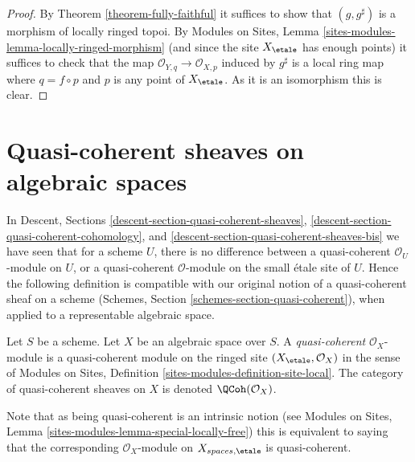 \begin{proof}
By
Theorem \ref{theorem-fully-faithful}
it suffices to show that $(g, g^\sharp)$ is a morphism of
locally ringed topoi. By
Modules on Sites, Lemma \ref{sites-modules-lemma-locally-ringed-morphism}
(and since the site $X_\etale$ has enough points)
it suffices to check that the map
$\mathcal{O}_{Y, q} \to \mathcal{O}_{X, p}$ induced by $g^\sharp$
is a local ring map where $q = f \circ p$ and $p$ is any point of
$X_\etale$. As it is an isomorphism this is clear.
\end{proof}














\section{Quasi-coherent sheaves on algebraic spaces}
\label{section-quasi-coherent}

\noindent
In
Descent, Sections \ref{descent-section-quasi-coherent-sheaves},
\ref{descent-section-quasi-coherent-cohomology}, and
\ref{descent-section-quasi-coherent-sheaves-bis}
we have seen that for a scheme $U$, there is no difference between a
quasi-coherent $\mathcal{O}_U$-module on $U$, or a quasi-coherent
$\mathcal{O}$-module on the small \'etale site of $U$. Hence the following
definition is compatible with our original notion of a quasi-coherent sheaf
on a scheme
(Schemes, Section \ref{schemes-section-quasi-coherent}),
when applied to a representable algebraic space.

\begin{definition}
\label{definition-quasi-coherent}
Let $S$ be a scheme. Let $X$ be an algebraic space over $S$.
A {\it quasi-coherent} $\mathcal{O}_X$-module
is a quasi-coherent module on the ringed site
$(X_\etale, \mathcal{O}_X)$ in the sense of
Modules on Sites,
Definition \ref{sites-modules-definition-site-local}.
The category of quasi-coherent sheaves on $X$ is denoted
$\QCoh(\mathcal{O}_X)$.
\end{definition}

\noindent
Note that as being quasi-coherent is an intrinsic notion (see
Modules on Sites, Lemma \ref{sites-modules-lemma-special-locally-free})
this is equivalent to saying that the corresponding $\mathcal{O}_X$-module
on $X_{spaces, \etale}$ is quasi-coherent.

